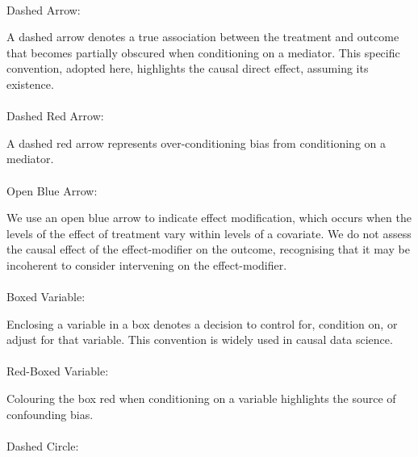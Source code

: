 \documentclass[
  single column]{article}
\makeatletter
\let\oldparagraph\paragraph
\renewcommand{\paragraph}{
    \@ifstar
      \xxxParagraphStar
      \xxxParagraphNoStar
  }
\newcommand{\xxxParagraphStar}[1]{\oldparagraph*{#1}\mbox{}}
\newcommand{\xxxParagraphNoStar}[1]{\oldparagraph{#1}\mbox{}}
\makeatother
\begin{document}
\paragraph{Dashed Arrow:}\label{dashed-arrow}

A dashed arrow denotes a true association between the treatment and
outcome that becomes partially obscured when conditioning on a mediator.
This specific convention, adopted here, highlights the causal direct
effect, assuming its existence.

\paragraph{Dashed Red Arrow:}\label{dashed-red-arrow}

A dashed red arrow represents over-conditioning bias from conditioning
on a mediator.

\paragraph{Open Blue Arrow:}\label{open-blue-arrow}

We use an open blue arrow to indicate effect modification, which occurs
when the levels of the effect of treatment vary within levels of a
covariate. We do not assess the causal effect of the effect-modifier on
the outcome, recognising that it may be incoherent to consider
intervening on the effect-modifier.

\paragraph{Boxed Variable:}\label{boxed-variable}

Enclosing a variable in a box denotes a decision to control for,
condition on, or adjust for that variable. This convention is widely
used in causal data science.

\paragraph{Red-Boxed Variable:}\label{red-boxed-variable}

Colouring the box red when conditioning on a variable highlights the
source of confounding bias.

\paragraph{Dashed Circle:}\label{dashed-circle}
\end{document}
